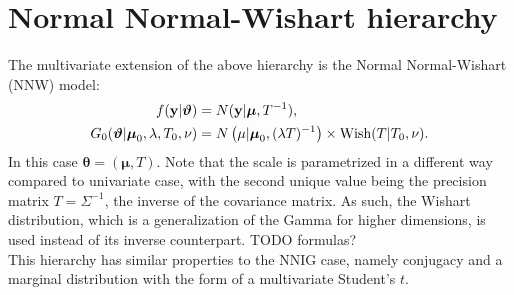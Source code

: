\section{Normal Normal-Wishart hierarchy} \label{nnw}
The multivariate extension of the above hierarchy is the Normal Normal-Wishart (NNW) model:
\begin{equation}
	\begin{aligned}
		f(\textbf y|\boldsymbol\theta) &= N(\textbf y | \boldsymbol\mu ,T^{-1}), \\
		G_0(\boldsymbol\theta|\boldsymbol \mu_0, \lambda, T_0, \nu)
		&= N\left(\mu | \boldsymbol\mu_0, (\lambda T)^{-1}\right) \times \text{Wish}(T|T_0, \nu).
	\end{aligned}
\end{equation}
In this case $\boldsymbol\theta=(\boldsymbol\mu, T)$.
Note that the scale is parametrized in a different way compared to univariate case, with the second unique value being the precision matrix $T = \Sigma^{-1}$, the inverse of the covariance matrix.
As such, the Wishart distribution, which is a generalization of the Gamma for higher dimensions, is used instead of its inverse counterpart. TODO formulas? \\
This hierarchy has similar properties to the NNIG case, namely conjugacy and a marginal distribution with the form of a multivariate Student's $t$.
